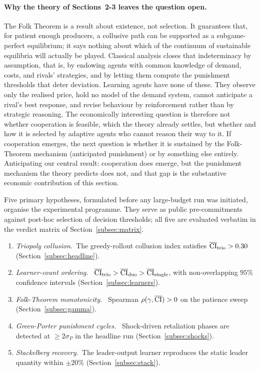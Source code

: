 \paragraph{Why the theory of Sections~2-3 leaves the question
open.}
The Folk Theorem is a result about existence, not
selection. It guarantees that, for patient enough
producers, a collusive path can be supported as a
subgame-perfect equilibrium; it says nothing about which
of the continuum of sustainable equilibria will actually be
played. Classical analysis closes that indeterminacy by
assumption, that is, by endowing agents with common knowledge of
demand, costs, and rivals' strategies, and by letting them compute
the punishment thresholds that deter deviation. Learning agents
have none of these. They observe only the realised price, hold no
model of the demand system, cannot anticipate a rival's
best response, and revise behaviour by reinforcement rather than
by strategic reasoning. The economically interesting question is
therefore not whether cooperation is feasible, which the
theory already settles, but whether and how it is
selected by adaptive agents who cannot reason their way to
it. If cooperation emerges, the next question is whether it is
sustained by the Folk-Theorem mechanism (anticipated punishment)
or by something else entirely. Anticipating our central result:
cooperation does emerge, but the punishment mechanism the theory
predicts does not, and that gap is the substantive economic
contribution of this section.

Five primary hypotheses, formulated before any large-budget run was
initiated, organise the experimental programme. They serve as
public pre-commitments against post-hoc selection of decision
thresholds; all five are evaluated verbatim in the verdict matrix
of Section~\ref{subsec:matrix}.

\begin{enumerate}\itemsep0pt
  \item[\textbf{H1.}] \emph{Triopoly collusion.}~The
        greedy-rollout collusion index satisfies
        $\overline{\mathrm{CI}}_{\text{trio}} > 0.30$
        (Section~\ref{subsec:headline}).
  \item[\textbf{H2.}] \emph{Learner-count ordering.}~
        $\overline{\mathrm{CI}}_{\text{trio}} > \overline{\mathrm{CI}}_{\text{duo}} >
        \overline{\mathrm{CI}}_{\text{single}}$, with non-overlapping $95\%$
        confidence intervals
        (Section~\ref{subsec:learners}).
  \item[\textbf{H3.}] \emph{Folk-Theorem monotonicity.}~
        Spearman $\rho(\gamma, \overline{\mathrm{CI}}) > 0$ on the patience
        sweep (Section~\ref{subsec:gamma}).
  \item[\textbf{H4.}] \emph{Green-Porter punishment cycles.}~
        Shock-driven retaliation phases are detected at
        $\geq 2\sigma_P$ in the headline run
        (Section~\ref{subsec:shocks}).
  \item[\textbf{H5.}] \emph{Stackelberg recovery.}~The
        leader-output learner reproduces the static leader
        quantity within $\pm 20\%$
        (Section~\ref{subsec:stack}).
\end{enumerate}

